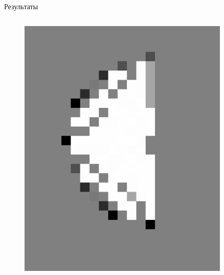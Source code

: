 \documentclass[9pt]{beamer}
\begin{document}
\begin{frame}{Результаты}
\begin{columns}
\begin{column}{0.5\textwidth}
  
  \begin{figure}[h]
    \centering
    \includegraphics[width=0.9\textwidth]{inv_arc_ex.png}
  \end{figure}


\end{column}
\end{columns}
\end{frame}
\end{document}

